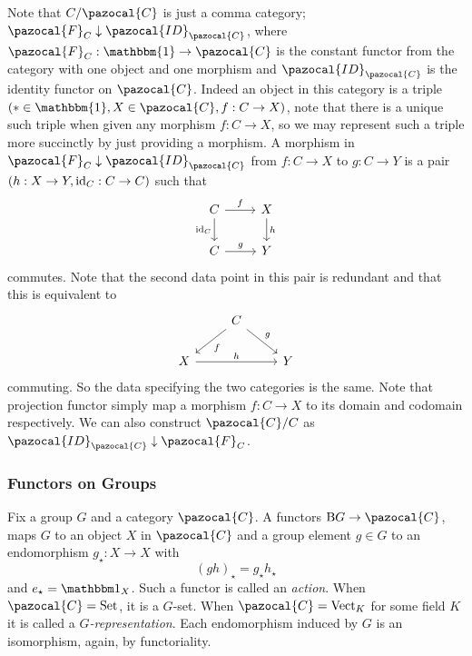 \begin{remark}
    Note that $C/\pazocal{C}$ is just a comma category; $\pazocal{F}_C\downarrow \pazocal{ID}_\pazocal{C}$, where $\pazocal{F}_C: \mathbbm{1} \rightarrow \pazocal{C}$ is the constant functor from the category with one object and one morphism and $\pazocal{ID}_\pazocal{C}$ is the identity functor on $\pazocal{C}$. Indeed an object in this category is a triple $(\ast\in \mathbbm{1},X\in \pazocal{C},f: C\rightarrow X)$, note that there is a unique such triple when given any morphism $f: C\rightarrow X$, so we may represent such a triple more succinctly by just providing a morphism. A morphism in $\pazocal{F}_C\downarrow \pazocal{ID}_\pazocal{C}$ from $f:C\rightarrow X$ to $g: C\rightarrow Y$ is a pair $(h:X\rightarrow Y, \mathrm{id}_C: C\rightarrow C)$ such that 
    $$
        \begin{tikzcd}
            C \arrow[r, "f"]\arrow[d,"\id_C",swap] & X\arrow[d, "h"]\\
            C \arrow[r, "g"] & Y  
        \end{tikzcd}
    $$
    commutes. Note that the second data point in this pair is redundant and that this is equivalent to 
    $$
        \begin{tikzcd}
            & C\arrow[ld, "f"]\arrow[rd, "g"]\\
            X \arrow{rr}{h} & & Y 
        \end{tikzcd}
    $$
    commuting. So the data specifying the two categories is the same. Note that projection functor simply map a morphism $f: C \rightarrow X$ to its domain and codomain respectively. We can also construct $\pazocal{C}/C$ as $\pazocal{ID}_\pazocal{C}\downarrow \pazocal{F}_C$.  
\end{remark} 
\subsubsection{Functors on Groups}
Fix a group $G$ and a category $\pazocal{C}$. A functors $\mathrm{B}G \rightarrow \pazocal{C}$, maps $G$ to an object $X$ in $\pazocal{C}$ and a group element $g\in G$ to an endomorphism $g_\star : X\rightarrow X$ with 
$$(gh)_\star = g_\star h_\star$$
and $e_\star = \fone_X$. Such a functor is called an \emph{action}. When $\pazocal{C} = \mathrm{Set}$, it is a $G$-set. When $\pazocal{C} = \mathrm{Vect}_K$ for some field $K$ it is called a \emph{$G$-representation}. Each endomorphism induced by $G$ is an isomorphism, again, by functoriality. 
